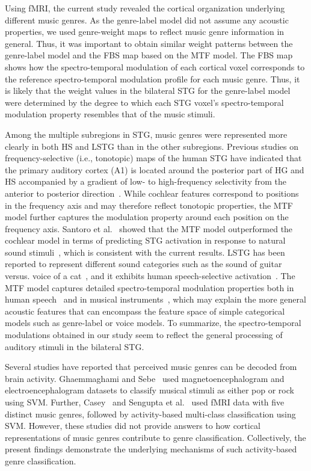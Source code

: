 \documentclass[journal]{IEEEtran}
\begin{document}
Using fMRI, the current study revealed the cortical organization underlying different music genres.
As the genre-label model did not assume any acoustic properties, we used genre-weight maps to reflect music genre information in general.
Thus, it was important to obtain similar weight patterns between the genre-label model and the FBS map based on the MTF model.
The FBS map shows how the spectro-temporal modulation of each cortical voxel corresponds to the reference spectro-temporal modulation profile for each music genre.
Thus, it is likely that the weight values in the bilateral STG for the genre-label model were determined by the degree to which each STG voxel's spectro-temporal modulation property resembles that of the music stimuli.


Among the multiple subregions in STG, music genres were represented more clearly in both HS and LSTG than in the other subregions.
Previous studies on frequency-selective (i.e., tonotopic) maps of the human STG have indicated that the primary auditory cortex (A1) is located around the posterior part of HG and HS accompanied by a gradient of low- to high-frequency selectivity from the anterior to posterior direction~\cite{ahveninen2016intracortical,leaver2016functional}.
While cochlear features correspond to positions in the frequency axis and may therefore reflect tonotopic properties, the MTF model further captures the modulation property around each position on the frequency axis.
Santoro et al.~\cite{santoro2014encoding} showed that the MTF model outperformed the cochlear model in terms of predicting STG activation in response to natural sound stimuli~\cite{santoro2014encoding}, which is consistent with the current results.
LSTG has been reported to represent different sound categories such as the sound of guitar versus. voice of a cat~\cite{staeren2009sound}, and it exhibits human speech-selective activation~\cite{norman2015distinct}.
The MTF model captures detailed spectro-temporal modulation properties both in human speech~\cite{elliott2009the} and in musical instruments~\cite{patil2012music}, which may explain the more general acoustic features that can encompass the feature space of simple categorical models such as genre-label or voice models.
To summarize, the spectro-temporal modulations obtained in our study seem to reflect the general processing of auditory stimuli in the bilateral STG.

Several studies have reported that perceived music genres can be decoded from brain activity.
Ghaemmaghami and Sebe~\cite{ghaemmaghami2016brain} used magnetoencephalogram and electroencephalogram datasets to classify musical stimuli as either pop or rock using SVM.
Further, Casey~\cite{casey2017music} and Sengupta et al.~\cite{sengupta2018spatial} used fMRI data with five distinct music genres, followed by activity-based multi-class classification using SVM.
However, these studies did not provide answers to how cortical representations of music genres contribute to genre classification.
Collectively, the present findings demonstrate the underlying mechanisms of such activity-based genre classification.
\end{document}

